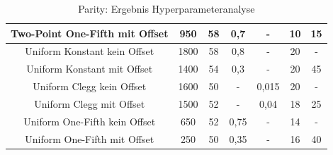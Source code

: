 \begin{table}[H]
\begin{tabular}{c | c | c | c | c | c | c}
		Two-Point One-Fifth mit Offset & 950 & 58 & 0,7 & - & 10 & 15 \\
		\hline
		Uniform Konstant kein Offset & 1800 & 58 & 0,8 & - & 20 & - \\
		\hline
		Uniform Konstant mit Offset & 1400 & 54 & 0,3 & - & 20 & 45 \\
		\hline
		Uniform Clegg kein Offset & 1600 & 50 & - & 0,015 & 20 & - \\
		\hline
		Uniform Clegg mit Offset & 1500 & 52 & - & 0,04 & 18 & 25 \\
		\hline
		Uniform One-Fifth kein Offset & 650 & 52 & 0,75 & - & 14 & - \\
		\hline
		Uniform One-Fifth mit Offset & 250 & 50 & 0,35 & - & 16 & 40 \\
	\end{tabular}
	\caption{Parity: Ergebnis Hyperparameteranalyse}
	\label{table:parityHPO}
\end{table}


